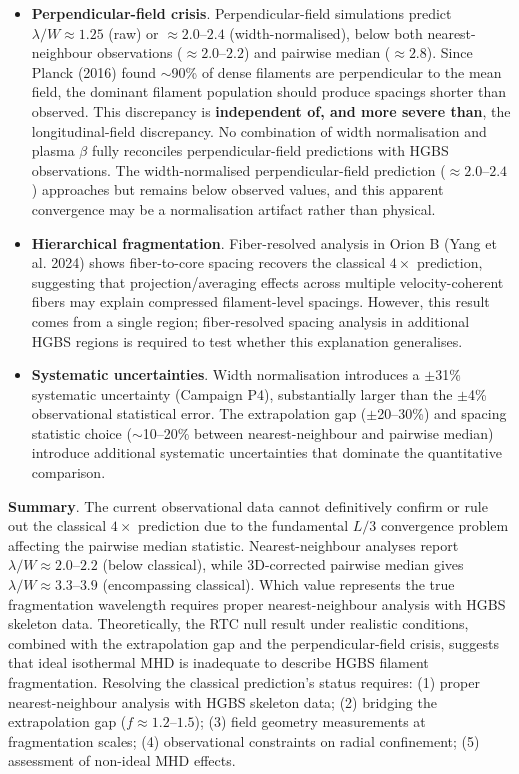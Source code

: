 \documentclass[twocolumn]{mnras}
\begin{document}
\begin{itemize}
    \item \textbf{Perpendicular-field crisis}. Perpendicular-field simulations predict $\lambda/W \approx 1.25$ (raw) or $\approx 2.0$--$2.4$ (width-normalised), below both nearest-neighbour observations ($\approx 2.0$--$2.2$) and pairwise median ($\approx 2.8$). Since Planck (2016) found $\sim$90\% of dense filaments are perpendicular to the mean field, the dominant filament population should produce spacings shorter than observed. This discrepancy is \textbf{independent of, and more severe than}, the longitudinal-field discrepancy. No combination of width normalisation and plasma $\beta$ fully reconciles perpendicular-field predictions with HGBS observations. The width-normalised perpendicular-field prediction ($\approx 2.0$--$2.4$) approaches but remains below observed values, and this apparent convergence may be a normalisation artifact rather than physical.

    \item \textbf{Hierarchical fragmentation}. Fiber-resolved analysis in Orion B (Yang et al. 2024) shows fiber-to-core spacing recovers the classical $4\times$ prediction, suggesting that projection/averaging effects across multiple velocity-coherent fibers may explain compressed filament-level spacings. However, this result comes from a single region; fiber-resolved spacing analysis in additional HGBS regions is required to test whether this explanation generalises.

    \item \textbf{Systematic uncertainties}. Width normalisation introduces a $\pm$31\% systematic uncertainty (Campaign P4), substantially larger than the $\pm$4\% observational statistical error. The extrapolation gap ($\pm$20--30\%) and spacing statistic choice ($\sim$10--20\% between nearest-neighbour and pairwise median) introduce additional systematic uncertainties that dominate the quantitative comparison.
\end{itemize}

\textbf{Summary}. The current observational data cannot definitively confirm or rule out the classical $4\times$ prediction due to the fundamental $L/3$ convergence problem affecting the pairwise median statistic. Nearest-neighbour analyses report $\lambda/W \approx 2.0$--$2.2$ (below classical), while 3D-corrected pairwise median gives $\lambda/W \approx 3.3$--$3.9$ (encompassing classical). Which value represents the true fragmentation wavelength requires proper nearest-neighbour analysis with HGBS skeleton data. Theoretically, the RTC null result under realistic conditions, combined with the extrapolation gap and the perpendicular-field crisis, suggests that ideal isothermal MHD is inadequate to describe HGBS filament fragmentation. Resolving the classical prediction's status requires: (1) proper nearest-neighbour analysis with HGBS skeleton data; (2) bridging the extrapolation gap ($f \approx 1.2$--$1.5$); (3) field geometry measurements at fragmentation scales; (4) observational constraints on radial confinement; (5) assessment of non-ideal MHD effects.
\end{document}
